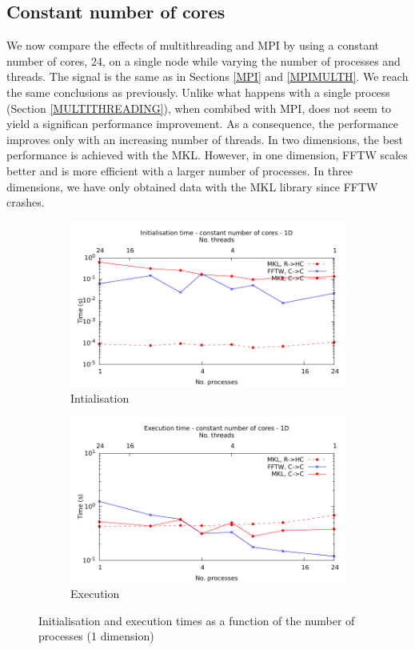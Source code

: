 \documentclass[12pt, a4paper]{article}
\begin{document}
\subsection{Constant number of cores}\label{CONST}
We now compare the effects of multithreading and MPI by using a constant number of cores, 24, on a single node while varying the number of processes and threads. The signal is the same as in Sections \ref{MPI} and \ref{MPIMULTH}. We reach the same conclusions as previously. Unlike what happens with a single process (Section \ref{MULTITHREADING}), when combibed with MPI, does not seem to yield a significan performance improvement. As a consequence, the performance improves only with an increasing number of threads. In two dimensions, the best performance is achieved with the MKL. However, in one dimension, FFTW scales better and is more efficient with a larger number of processes. In three dimensions, we have only obtained data with the MKL library since FFTW crashes.
\begin{figure}[H]
\captionsetup{width=0.8\linewidth}
\centering
\begin{subfigure}{.5\textwidth}
\centering
\includegraphics[width=.9\linewidth]{graphs/const-init-1d.pdf}
\caption{Intialisation}
\label{1DCONSTI}
\end{subfigure}%
\begin{subfigure}{.5\textwidth}
\centering
\includegraphics[width=.9\linewidth]{graphs/const-exec-1d.pdf}
\caption{Execution}
\label{1DCONSTE}
\end{subfigure}
\caption{Initialisation and execution times as a function of the number of processes (1 dimension)}
\label{1DCONST}
\end{figure}
\end{document}

